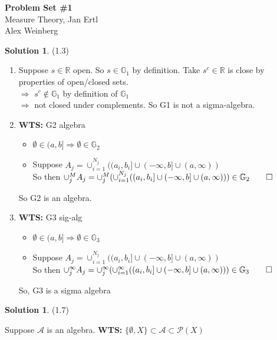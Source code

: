 \documentclass[letterpaper,12pt]{article}
\theoremstyle{definition}
\newtheorem{solution}[theorem]{Solution}
\begin{document}
\begin{flushleft}
  \textbf{\large{Problem Set \#1}} \\
  Measure Theory, Jan Ertl \\
  Alex Weinberg
\end{flushleft}

\vspace{5mm}

\begin{solution}(1.3)
  \begin{enumerate}
  \item
  Suppose $s \in \mathbb{R} $ open. So $s \in \mathbb{G}_1$ by definition. Take $s^c \in \mathbb{R}$ is close by properties of open/closed sets. \\
  $\Rightarrow$ $s^c \not \in \mathbb{G}_1$ by definition of $\mathbb{G}_1$ \\
  $\Rightarrow$ not closed under complements. So G1 is not a sigma-algebra.

  \item \textbf{WTS:} G2 algebra
  \begin{itemize}
  \item $\emptyset \in (a,b] \Rightarrow \emptyset \in \mathbb{G}_2 $
  \item Suppose $A_j = \cup_{i=1}^{N_j} ((a_i,b_i] \cup (-\infty,b] \cup (a,\infty))$ \\
  So then $\cup_j^M A_j = \cup_j^M (\cup_{i=1}^{N_j} ((a_i,b_i] \cup (-\infty,b] \cup (a,\infty))) \in \mathbb{G}_2 \qed$
  \end{itemize}
  So G2 is an algebra.

  \item \textbf{WTS:} G3 sig-alg
  \begin{itemize}
    \item $\emptyset \in (a,b] \Rightarrow \emptyset \in \mathbb{G}_3 $
    \item Suppose $A_j = \cup_{i=1}^{N_j} ((a_i,b_i] \cup (-\infty,b] \cup (a,\infty))$ \\
    So then $\cup_j^\infty A_j = \cup_j^\infty (\cup_{i=1}^{\infty} ((a_i,b_i] \cup (-\infty,b] \cup (a,\infty))) \in \mathbb{G}_3 \qed$
  \end{itemize}
  So, G3 is a sigma algebra
  \end{enumerate}
\end{solution}

\begin{solution} (1.7)

Suppose $\mathcal{A}$ is an algebra. \textbf{WTS:} $\{\emptyset,X\} \subset \mathcal{A} \subset \mathcal{P}(X)$
\end{solution}
\end{document}
